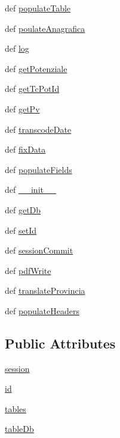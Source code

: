 \begin{DoxyCompactItemize}
\item 
def \hyperlink{classmmasgis_1_1utility_1_1utility_aa5aec09610c2c4f0da05bc6573632af2}{populateTable}
\item 
def \hyperlink{classmmasgis_1_1utility_1_1utility_a5eb835955c14a65819ecda22796237f4}{poulateAnagrafica}
\item 
def \hyperlink{classmmasgis_1_1utility_1_1utility_a68cbd53cf9e2c7a069801095dae70855}{log}
\item 
def \hyperlink{classmmasgis_1_1utility_1_1utility_abefe65fee4f8f4b25f7e14b59dc530b5}{getPotenziale}
\item 
def \hyperlink{classmmasgis_1_1utility_1_1utility_aa537751fade51d2ec679fd46d726f112}{getTcPotId}
\item 
def \hyperlink{classmmasgis_1_1utility_1_1utility_a5b4510ce65c2cd04842fbb0b76be0065}{getPv}
\item 
def \hyperlink{classmmasgis_1_1utility_1_1utility_a66109782d6c5dfd4d9e7c8ebe9b87355}{transcodeDate}
\item 
def \hyperlink{classmmasgis_1_1utility_1_1utility_a4ec702b79350b9067b6f5e25fd62255c}{fixData}
\item 
def \hyperlink{classmmasgis_1_1utility_1_1utility_a73927eb7347992e983c8b676c1ca223e}{populateFields}
\item 
def \hyperlink{classmmasgis_1_1utility_1_1utility_aa62bc8708213ae38f44de523e32d0233}{\_\-\_\-init\_\-\_\-}
\item 
def \hyperlink{classmmasgis_1_1utility_1_1utility_a49de16e111fb7b7390969054873a9ee8}{getDb}
\item 
def \hyperlink{classmmasgis_1_1utility_1_1utility_a3ad458c068892947d5eed3a7ef1bbc85}{setId}
\item 
def \hyperlink{classmmasgis_1_1utility_1_1utility_ae4bd46d6731f852e8a9d20445cc5f9dc}{sessionCommit}
\item 
def \hyperlink{classmmasgis_1_1utility_1_1utility_a5429f6daf768cce6f82d1deec0e5fba1}{pdfWrite}
\item 
def \hyperlink{classmmasgis_1_1utility_1_1utility_aff724c9fa72e57ecf4cee2a6a1a53c4e}{translateProvincia}
\item 
def \hyperlink{classmmasgis_1_1utility_1_1utility_ae25879b1f4d2ef98a424aaa3dcfc5d1e}{populateHeaders}
\end{DoxyCompactItemize}
\subsection*{Public Attributes}
\begin{DoxyCompactItemize}
\item 
\hyperlink{classmmasgis_1_1utility_1_1utility_a219f0fab3a30df35c2ba24960558567a}{session}
\item 
\hyperlink{classmmasgis_1_1utility_1_1utility_a0733ec1f33b6b7fb08407088cfc0e7ea}{id}
\item 
\hyperlink{classmmasgis_1_1utility_1_1utility_a1cc2147ed2f10d6a7f1b1503b5bcc6ca}{tables}
\item 
\hyperlink{classmmasgis_1_1utility_1_1utility_a70b79af922720708f6edae7ed01aec49}{tableDb}
\end{DoxyCompactItemize}
